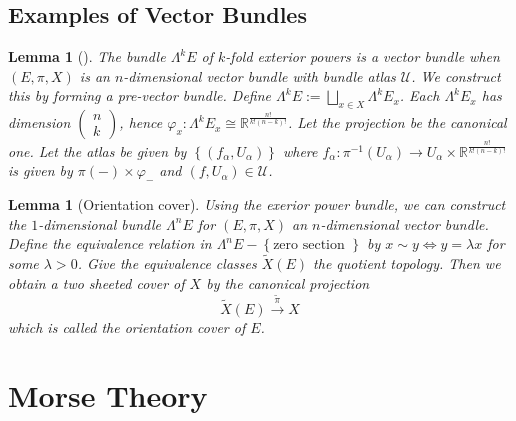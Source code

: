 \documentclass[reqno]{amsart}
\newtheorem{lemma}[theorem]{Lemma}
\theoremstyle{definition}
\theoremstyle{remark}
\begin{document}
    \subsection{Examples of Vector Bundles}

    \begin{lemma}[]
        The bundle $\Lambda^{k} E$ of
        $k$-fold exterior powers
        is a vector bundle when
        $\left( E, \pi, X \right) $ is an
        $n$-dimensional vector bundle with
        bundle atlas $\mathcal{U}$.
        We construct this by forming a pre-vector bundle.
        Define
        $\Lambda^{k}E :=
        \bigsqcup_{x \in X} \Lambda^{k} E_x$.
        Each $\Lambda^{k}E_x$ has dimension
        $\begin{pmatrix} n \\ k \end{pmatrix} $, hence
        $\varphi_x \colon
        \Lambda^{k} E_x \cong \mathbb{R}^{\frac{n!}{k! (n-k)!} }$.
        Let the projection be the canonical one.
        Let the atlas be given
        by
        $\left\{ \left( f_{\alpha},
        U_{\alpha} \right)  \right\} $ where
        $f_{\alpha} \colon \pi^{-1}(U_{\alpha})
        \to U_{\alpha} \times \mathbb{R}^{\frac{n!}{k! 
        \left( n-k \right)!}}$ 
        is given by
        $\pi(-) \times \varphi_{-}$ 
        and
        $\left( f, U_{\alpha} \right) 
        \in \mathcal{U}$.
    \end{lemma}

    \begin{lemma}[Orientation cover]
        Using the exerior power bundle, we can
        construct the $1$-dimensional bundle
        $\Lambda^{n}E$ for $\left( E, \pi, X \right) $ an
        $n$-dimensional vector bundle.
        Define the equivalence relation
        in $\Lambda^{n}E - \left\{ \text{zero section } \right\} $ 
        by $x \sim y \iff y = \lambda x$ for some
        $\lambda > 0$. Give the equivalence classes
        $\tilde{X}(E)$ the quotient topology. Then
        we obtain a two sheeted cover
        of $X$ by the canonical projection
        \[
            \tilde{X}(E) \stackrel{\tilde{\pi}}{\to } X
        \] 
        which is called the orientation cover of $E$.
    \end{lemma}

        
        


    \section{Morse Theory}
\end{document}

